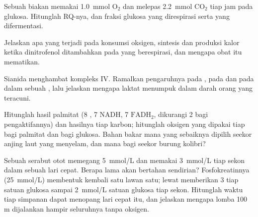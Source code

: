 \begin{exercise}[$\star\star$]\label{exo:b1:respiration-fermentation:7}
Sebuah biakan memakai \qty{1.0}{mmol} $\mathrm{O_2}$ dan melepas
\qty{2.2}{mmol} $\mathrm{CO_2}$ tiap jam pada glukosa. Hitunglah
RQ-nya, dan fraksi glukosa yang direspirasi serta yang difermentasi.
\end{exercise}

\begin{exercise}[$\star\star$]\label{exo:b1:respiration-fermentation:8}
Jelaskan apa yang terjadi pada konsumsi oksigen, sintesis  dan
produksi kalor ketika dinitrofenol ditambahkan pada  yang
berespirasi, dan mengapa obat itu mematikan.
\end{exercise}

\begin{exercise}[$\star\star$]\label{exo:b1:respiration-fermentation:9}
Sianida menghambat kompleks IV. Ramalkan pengaruhnya pada , pada  dan pada  dalam sebuah , lalu
jelaskan mengapa laktat menumpuk dalam darah orang yang teracuni.
\end{exercise}

\begin{exercise}[$\star\star\star$]\label{exo:b1:respiration-fermentation:10}
Hitunglah hasil  palmitat (8 , 7 NADH, 7
$\mathrm{FADH_2}$, dikurangi 2  bagi pengaktifannya) dan hasilnya
tiap karbon; hitunglah oksigen yang dipakai tiap  bagi palmitat dan
bagi glukosa. Bahan bakar mana yang sebaiknya dipilih seekor anjing
laut yang menyelam, dan mana bagi seekor burung kolibri?
\end{exercise}

\begin{exercise}[$\star\star\star$]\label{exo:b1:respiration-fermentation:11}
Sebuah serabut otot memegang \qty{5}{mmol/L}  dan memakai
\qty{3}{mmol/L} tiap sekon dalam sebuah lari cepat. Berapa lama 
akan bertahan sendirian? Fosfokreatinnya (\qty{25}{mmol/L}) membentuk
kembali  satu lawan satu;  lewat  memberikan 3
 tiap satuan glukosa sampai \qty{2}{mmol/L} satuan glukosa tiap
sekon. Hitunglah waktu tiap simpanan dapat menopang lari cepat itu, dan
jelaskan mengapa lomba 100 m dijalankan hampir seluruhnya tanpa oksigen.
\end{exercise}

